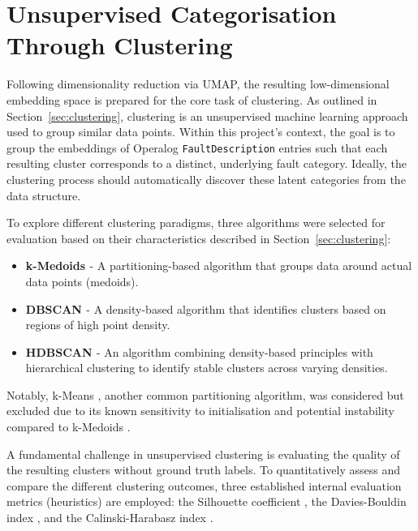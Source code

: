 \documentclass[10pt,oneside]{report}
\begin{document}
\section{Unsupervised Categorisation Through Clustering}\label{sec:unsupcat}

Following dimensionality reduction via UMAP, the resulting low-dimensional embedding space is prepared for the core task of clustering. As outlined in Section~\ref{sec:clustering}, clustering is an unsupervised machine learning approach used to group similar data points. Within this project's context, the goal is to group the embeddings of Operalog \texttt{FaultDescription} entries such that each resulting cluster corresponds to a distinct, underlying fault category. Ideally, the clustering process should automatically discover these latent categories from the data structure.

To explore different clustering paradigms, three algorithms were selected for evaluation based on their characteristics described in Section~\ref{sec:clustering}:

\begin{itemize}
    \item \textbf{k-Medoids \cite{kmedoids}} - A partitioning-based algorithm that groups data around actual data points (medoids).
    \item \textbf{DBSCAN \cite{ester1996density}} - A density-based algorithm that identifies clusters based on regions of high point density.
    \item \textbf{HDBSCAN \cite{campello2013density}} - An algorithm combining density-based principles with hierarchical clustering to identify stable clusters across varying densities.
\end{itemize}

Notably, k-Means \cite{macqueen1967some}, another common partitioning algorithm, was considered but excluded due to its known sensitivity to initialisation and potential instability compared to k-Medoids \cite{zhang2008improved}.

A fundamental challenge in unsupervised clustering is evaluating the quality of the resulting clusters without ground truth labels. To quantitatively assess and compare the different clustering outcomes, three established internal evaluation metrics (heuristics) are employed: the Silhouette coefficient \cite{rousseeuw1987silhouettes}, the Davies-Bouldin index \cite{davies1979cluster}, and the Calinski-Harabasz index \cite{calinski1974dendrite}.
\end{document}
